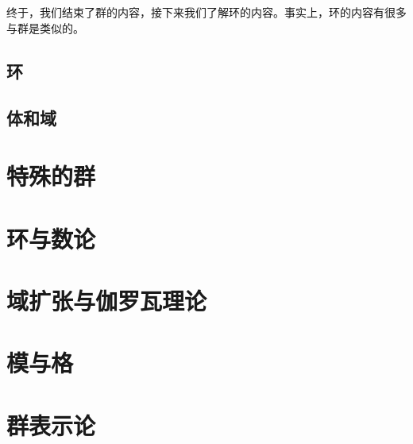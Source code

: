 \documentclass[12pt,a4paper,UTF8]{ctexbook}
\theoremstyle{plain}
\begin{document}
\paragraph{}终于，我们结束了群的内容，接下来我们了解环的内容。事实上，环的内容有很多与群是类似的。

\section{环}


\section{体和域}

\chapter{特殊的群}

\chapter{环与数论}

\chapter{域扩张与伽罗瓦理论}

\chapter{模与格}

\chapter{群表示论}
\end{document}
